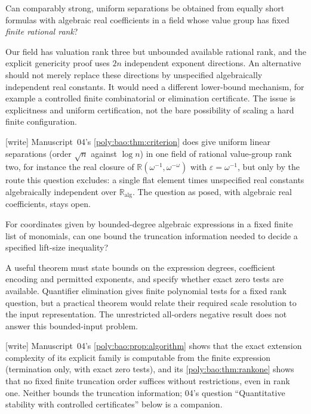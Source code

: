 \documentclass[11pt,a4paper]{article}
\numberwithin{equation}{section}
\theoremstyle{plain}
\newcommand{\wtag}{\textup{[write]}}%
\newcommand{\R}{\mathbb R}
\newcommand{\eps}{\varepsilon}
\newcommand{\A}{\mathbb R_{\mathrm{alg}}}
\begin{document}
\begin{question}
Can comparably strong, uniform separations be obtained from equally
short formulas with algebraic real coefficients in a field whose value
group has fixed \emph{finite rational rank}?
\end{question}
Our field has valuation rank three but unbounded available rational
rank, and the explicit genericity proof uses $2n$ independent exponent
directions. An alternative should not merely replace these directions
by unspecified algebraically independent real constants. It would need
a different lower-bound mechanism, for example a controlled finite
combinatorial or elimination certificate. The issue is explicitness and
uniform certification, not the bare possibility of scaling a hard
finite configuration.

\wtag{} Manuscript~04's \cref{poly:bao:thm:criterion} does give uniform
linear separations (order $\sqrt n$ against $\log n$) in one field of
rational value-group rank two, for instance the real closure of
$\R(\omega^{-1},\omega^{-\omega})$ with $\eps=\omega^{-1}$, but only by the
route this question excludes: a single flat element times unspecified real
constants algebraically independent over $\A$. The question as posed,
with algebraic real coefficients, stays open.

\begin{question}
For coordinates given by bounded-degree algebraic expressions in a
fixed finite list of monomials, can one bound the truncation information
needed to decide a specified lift-size inequality?
\end{question}
A useful theorem must state bounds on the expression degrees, coefficient
encoding and permitted exponents, and specify whether exact zero tests
are available. Quantifier elimination gives finite polynomial tests for
a fixed rank question, but a practical theorem would relate their
required scale resolution to the input representation. The unrestricted
all-orders negative result does not answer this bounded-input problem.

\wtag{} Manuscript~04's \cref{poly:bao:prop:algorithm} shows that the exact
extension complexity of its explicit family is computable from the finite
expression (termination only, with exact zero tests), and its
\cref{poly:bao:thm:rankone} shows that no fixed finite truncation order
suffices without restrictions, even in rank one. Neither bounds the
truncation information; 04's question ``Quantitative stability with
controlled certificates'' below is a companion.
\end{document}
